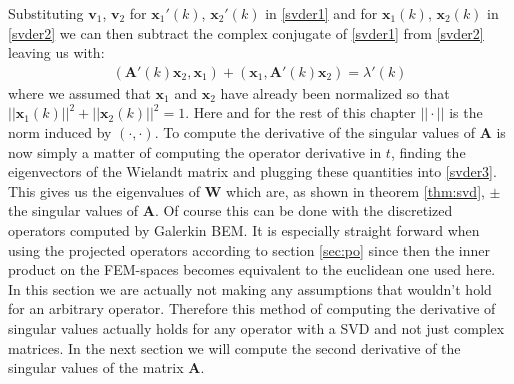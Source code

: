 \documentclass[a4paper, oneside]{thirdparty_stylesheets/discothesis}
\begin{document}
Substituting $\mathbf{v}_1$, $\mathbf{v}_2$ for $\mathbf{x}_1'(k)$, $\mathbf{x}_2'(k)$ in \ref{svder1} and for $\mathbf{x}_1(k)$, $\mathbf{x}_2(k)$ in \ref{svder2} we can then subtract the complex conjugate of \ref{svder1} from \ref{svder2} leaving us with:
\begin{align}
	(\mathbf{A}'(k)\mathbf{x}_2, \mathbf{x}_1) + (\mathbf{x}_1,\mathbf{A}'(k)\mathbf{x}_2) =
	\lambda'(k) 
	\label{svder3}
\end{align}
where we assumed that $\mathbf{x}_1$ and $\mathbf{x}_2$ have already been normalized so that $||\mathbf{x}_1(k)||^2 + ||\mathbf{x}_2(k)||^2 = 1$.
Here and for the rest of this chapter $||\cdot||$ is the norm induced by $(\cdot,\cdot)$.
To compute the derivative of the singular values of $\mathbf{A}$ is now simply a matter of computing the operator derivative in $t$, finding the eigenvectors of the Wielandt matrix and plugging these quantities into \ref{svder3}.
This gives us the eigenvalues of $\mathbf{W}$ which are, as shown in theorem \ref{thm:svd}, $\pm$ the singular values of $\mathbf{A}$.
Of course this can be done with the discretized operators computed by Galerkin BEM.
It is especially straight forward when using the projected operators according to section \ref{sec:po} since then the inner product on the FEM-spaces becomes equivalent to the euclidean one used here.
In this section we are actually not making any assumptions that wouldn't hold for an arbitrary operator.
Therefore this method of computing the derivative of singular values actually holds for any operator with a SVD and not just complex matrices.
In the next section we will compute the second derivative of the singular values of the matrix $\mathbf{A}$.
\end{document}
